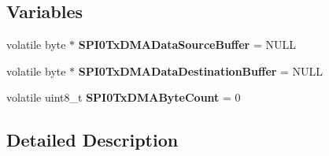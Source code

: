 \subsection*{Variables}
\begin{DoxyCompactItemize}
\item 
\hypertarget{group___d_m_a_t___m___s_p_i___t_x__module_gab34b937e7c57785b243eed2da5d56abf}{volatile byte $\ast$ {\bfseries S\-P\-I0\-Tx\-D\-M\-A\-Data\-Source\-Buffer} = N\-U\-L\-L}\label{group___d_m_a_t___m___s_p_i___t_x__module_gab34b937e7c57785b243eed2da5d56abf}

\item 
\hypertarget{group___d_m_a_t___m___s_p_i___t_x__module_ga4a2e1852c2187cae55437bbfc0214912}{volatile byte $\ast$ {\bfseries S\-P\-I0\-Tx\-D\-M\-A\-Data\-Destination\-Buffer} = N\-U\-L\-L}\label{group___d_m_a_t___m___s_p_i___t_x__module_ga4a2e1852c2187cae55437bbfc0214912}

\item 
\hypertarget{group___d_m_a_t___m___s_p_i___t_x__module_ga86aead055d070940d230ef5f6285adcd}{volatile uint8\-\_\-t {\bfseries S\-P\-I0\-Tx\-D\-M\-A\-Byte\-Count} = 0}\label{group___d_m_a_t___m___s_p_i___t_x__module_ga86aead055d070940d230ef5f6285adcd}

\end{DoxyCompactItemize}


\subsection{Detailed Description}


